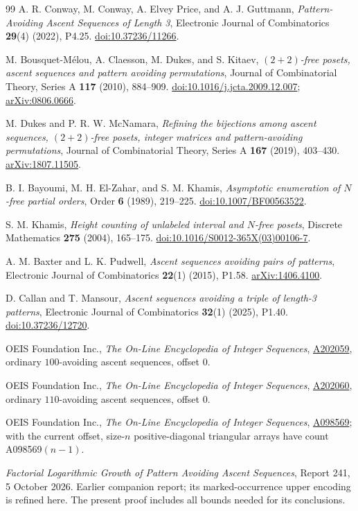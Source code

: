 \begin{thebibliography}{99}
A. R. Conway, M. Conway, A. Elvey Price, and A. J. Guttmann,
\emph{Pattern-Avoiding Ascent Sequences of Length 3},
Electronic Journal of Combinatorics \textbf{29}(4) (2022), P4.25.
\href{https://doi.org/10.37236/11266}{doi:10.37236/11266}.

M. Bousquet-M\'elou, A. Claesson, M. Dukes, and S. Kitaev,
\emph{$(2+2)$-free posets, ascent sequences and pattern avoiding permutations},
Journal of Combinatorial Theory, Series A \textbf{117} (2010), 884--909.
\href{https://doi.org/10.1016/j.jcta.2009.12.007}{doi:10.1016/j.jcta.2009.12.007};
\href{https://arxiv.org/abs/0806.0666}{arXiv:0806.0666}.

M. Dukes and P. R. W. McNamara,
\emph{Refining the bijections among ascent sequences, $(2+2)$-free posets, integer matrices and pattern-avoiding permutations},
Journal of Combinatorial Theory, Series A \textbf{167} (2019), 403--430.
\href{https://arxiv.org/abs/1807.11505}{arXiv:1807.11505}.

B. I. Bayoumi, M. H. El-Zahar, and S. M. Khamis,
\emph{Asymptotic enumeration of $N$-free partial orders},
Order \textbf{6} (1989), 219--225.
\href{https://doi.org/10.1007/BF00563522}{doi:10.1007/BF00563522}.

S. M. Khamis,
\emph{Height counting of unlabeled interval and $N$-free posets},
Discrete Mathematics \textbf{275} (2004), 165--175.
\href{https://doi.org/10.1016/S0012-365X(03)00106-7}{doi:10.1016/S0012-365X(03)00106-7}.

A. M. Baxter and L. K. Pudwell,
\emph{Ascent sequences avoiding pairs of patterns},
Electronic Journal of Combinatorics \textbf{22}(1) (2015), P1.58.
\href{https://arxiv.org/abs/1406.4100}{arXiv:1406.4100}.

D. Callan and T. Mansour,
\emph{Ascent sequences avoiding a triple of length-3 patterns},
Electronic Journal of Combinatorics \textbf{32}(1) (2025), P1.40.
\href{https://doi.org/10.37236/12720}{doi:10.37236/12720}.

OEIS Foundation Inc., \emph{The On-Line Encyclopedia of Integer Sequences},
\href{https://oeis.org/A202059}{A202059}, ordinary $100$-avoiding ascent sequences, offset $0$.

OEIS Foundation Inc., \emph{The On-Line Encyclopedia of Integer Sequences},
\href{https://oeis.org/A202060}{A202060}, ordinary $110$-avoiding ascent sequences, offset $0$.

OEIS Foundation Inc., \emph{The On-Line Encyclopedia of Integer Sequences},
\href{https://oeis.org/A098569}{A098569}; with the current offset,
size-$n$ positive-diagonal triangular arrays have count A098569$(n-1)$.

\emph{Factorial Logarithmic Growth of Pattern Avoiding Ascent Sequences},
Report 241, 5 October 2026. Earlier companion report; its marked-occurrence upper encoding is refined here. The present proof includes all bounds needed for its conclusions.
\end{thebibliography}
